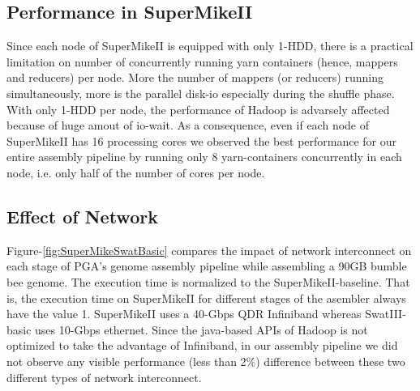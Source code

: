 \documentclass[conference]{IEEEtran}
\begin{document}
\subsection {Performance in SuperMikeII}
\label{PerformanceInSuperMikeII}
Since each node of SuperMikeII is equipped with only 1-HDD, there is a practical limitation on number of concurrently running yarn containers (hence, mappers and reducers) per node. 
More the number of mappers (or reducers) running simultaneously, more is the parallel disk-io especially during the shuffle phase. 
With only 1-HDD per node, the performance of Hadoop is advarsely affected because of huge amout of io-wait.
As a consequence, even if each node of SuperMikeII has 16 processing cores we observed the best performance for our entire assembly pipeline by running only 8 yarn-containers concurrently in each node, i.e. only half of the number of cores per node.


\subsection {Effect of Network} \label{EffectOfNetwork}
Figure-\ref{fig:SuperMikeSwatBasic} compares the impact of network interconnect on each stage of PGA's genome assembly pipeline while assembling a 90GB bumble bee genome. 
The execution time is normalized to the SuperMikeII-baseline. That is, the execution time on SuperMikeII for different stages of the asembler always have the value 1.
SuperMikeII uses a 40-Gbps QDR Infiniband whereas SwatIII-basic uses 10-Gbps ethernet. 
Since the java-based APIs of Hadoop is not optimized to take the advantage of Infiniband, in our assembly pipeline we did not observe any visible performance (less than 2\%) difference between these two different types of network interconnect.

\end{document}

